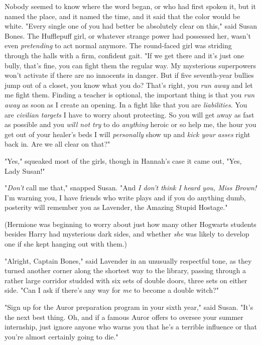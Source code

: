 Nobody seemed to know where the word began, or who had first spoken it, but it
named the place, and it named the time, and it said that the color would be
white.
\sbreak
"Every single one of you had better be absolutely clear on this," said Susan
Bones. The Hufflepuff girl, or whatever strange power had possessed her, wasn't
even \emph{pretending} to act normal anymore. The round-faced girl was striding
through the halls with a firm, confident gait. "If we get there and it's just
one bully, that's fine, you can fight them the regular way. My mysterious
superpowers won't activate if there are no innocents in danger. But if five
seventh-year bullies jump out of a closet, you know what you do? That's right,
you \emph{run away} and let me fight them. Finding a teacher is optional, the
important thing is that you \emph{run away} as soon as I create an opening. In
a fight like that you are \emph{liabilities}. You are \emph{civilian targets} I
have to worry about protecting. So you will get away as fast as possible and
you \emph{will not try} to do \emph{anything} heroic or so help me, the hour
you get out of your healer's beds I will \emph{personally} show up and
\emph{kick your asses} right back in. Are we all clear on that?"

"Yes," squeaked most of the girls, though in Hannah's case it came out, "Yes,
Lady Susan!"

"\emph{Don't} call me that," snapped Susan. "And \emph{I don't think I heard
you, Miss Brown!} I'm warning you, I have friends who write plays and if you do
anything dumb, posterity will remember you as Lavender, the Amazing Stupid
Hostage."

(Hermione was beginning to worry about just how many other Hogwarts students
besides Harry had mysterious dark sides, and whether \emph{she} was likely to
develop one if she kept hanging out with them.)

"Alright, Captain Bones," said Lavender in an unusually respectful tone, as
they turned another corner along the shortest way to the library, passing
through a rather large corridor studded with six sets of double doors, three
sets on either side. "Can I ask if there's any way for \emph{me} to become a
double witch?"

"Sign up for the Auror preparation program in your sixth year," said Susan.
"It's the next best thing. Oh, and if a famous Auror offers to oversee your
summer internship, just ignore anyone who warns you that he's a terrible
influence or that you're almost certainly going to die."

